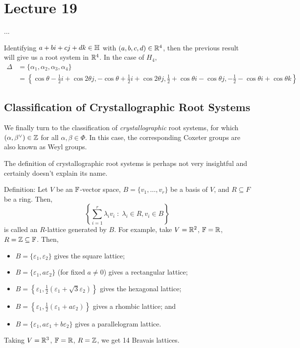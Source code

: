 \section{Lecture 19}

... %


Identifying $a+bi+cj+dk \in \mathbb{H}$ with $(a,b,c,d) \in \mathbb{R}^4$, then the previous
result will give us a root system in $\mathbb{R}^4$. In the case of $H_4$,
\begin{align*} %
    \Delta &= \{\alpha_1, \alpha_2, \alpha_3, \alpha_4\} \\
    &= \left\{
        \cos \theta - \frac{1}{2} i + \cos 2\theta j,
        -\cos \theta + \frac{1}{2} i + \cos 2\theta j,
        \frac{1}{2} + \cos \theta i - \cos \theta j,
        -\frac{1}{2} - \cos \theta i + \cos \theta k
    \right\}
\end{align*}

\subsection{Classification of Crystallographic Root Systems}

We finally turn to the classification of {\em crystallographic} root systems,
for which $(\alpha, \beta^\vee) \in \mathbb{Z}$ for all $\alpha, \beta \in \Phi$.
In this case, the corresponding Coxeter groups are also known as Weyl groups.

The definition of crystallographic root systems is perhaps not very insightful
and certainly doesn't explain its name.

Definition: Let $V$ be an $\mathbb{F}$-vector space, $B = \{v_1, \dots, v_r\}$ be a
basis of $V$, and $R \subseteq F$ be a ring. Then,
\[
    \left\{ \sum_{i=1}^{r} \lambda_i v_i \; : \; \lambda_i \in R, v_i \in B\right\}
\]
is called an $R$-lattice generated by $B$.
For example, take $V = \mathbb{R}^2$, $\mathbb{F} = \mathbb{R}$, $R = \mathbb{Z} \subseteq \mathbb{F}$. Then,
\begin{itemize}
\item
$B = \{\varepsilon_1, \varepsilon_2\}$ gives the square lattice;
\item
$B = \{\varepsilon_1, a\varepsilon_2\}$ (for fixed $a \neq 0$) gives a
rectangular lattice;
\item
$B = \left\{\varepsilon_1, \frac{1}{2}(\varepsilon_1 + \sqrt{3} \varepsilon_2)\right\}$
gives the hexagonal lattice;
\item
$B = \left\{\varepsilon_1, \frac{1}{2} (\varepsilon_1 + a\varepsilon_2) \right\}$
gives a rhombic lattice; and
\item
$B = \{\varepsilon_1, a\varepsilon_1 + b\varepsilon_2\}$
gives a parallelogram lattice.
\end{itemize}
Taking $V = \mathbb{R}^3$, $\mathbb{F} = \mathbb{R}$, $R = \mathbb{Z}$, we get 14 Bravais lattices.

